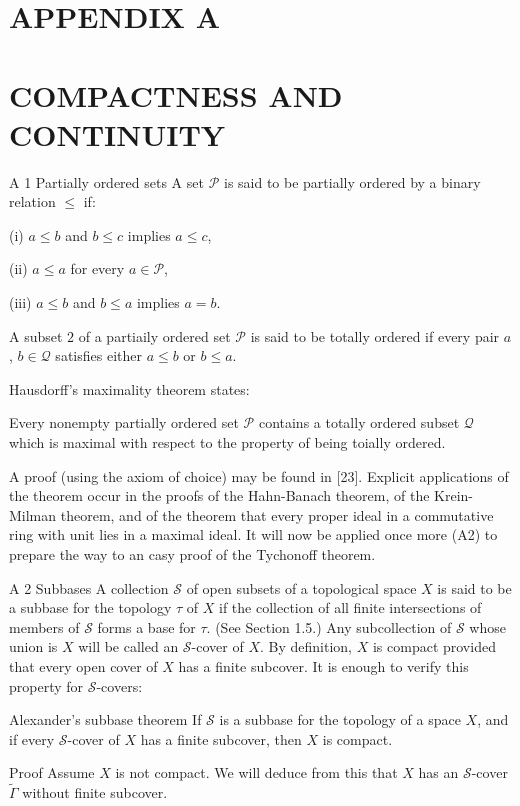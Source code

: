 \documentclass[10pt]{article}
\begin{document}
\section{APPENDIX A}
\section{COMPACTNESS AND CONTINUITY}
A 1 Partially ordered sets A set $\mathscr{P}$ is said to be partially ordered by a binary relation
$\leq$ if:

(i) $a \leq b$ and $b \leq c$ implies $a \leq c$,

(ii) $a \leq a$ for every $a \in \mathscr{P}$,

(iii) $a \leq b$ and $b \leq a$ implies $a=b$.

A subset $\mathscr{2}$ of a partiaily ordered set $\mathscr{P}$ is said to be totally ordered if every pair $a$, $b \in \mathscr{Q}$ satisfies either $a \leq b$ or $b \leq a$.

Hausdorff's maximality theorem states:

Every nonempty partially ordered set $\mathscr{P}$ contains a totally ordered subset $\mathscr{Q}$ which is maximal with respect to the property of being toially ordered.

A proof (using the axiom of choice) may be found in [23]. Explicit applications of the theorem occur in the proofs of the Hahn-Banach theorem, of the Krein-Milman theorem, and of the theorem that every proper ideal in a commutative ring with unit lies in a maximal ideal. It will now be applied once more (A2) to prepare the way to an casy proof of the
Tychonoff theorem.

A 2 Subbases A collection $\mathscr{S}$ of open subsets of a topological space $X$ is said to be a subbase for the topology $\tau$ of $X$ if the collection of all finite intersections of members of $\mathscr{S}$ forms a base for $\tau$. (See Section 1.5.) Any subcollection of $\mathscr{S}$ whose union is $X$ will be called an $\mathscr{S}$-cover of $X$. By definition, $X$ is compact provided that every open cover of $X$ has a finite subcover. It is enough to verify this property for $\mathscr{S}$-covers:

Alexander's subbase theorem If $\mathscr{S}$ is a subbase for the topology of a space $X$, and if every $\mathscr{S}$-cover of $X$ has a finite subcover, then $X$ is compact.

Proof Assume $X$ is not compact. We will deduce from this that $X$ has an $\mathscr{S}$-cover $\tilde{\Gamma}$ without finite subcover.
\end{document}
